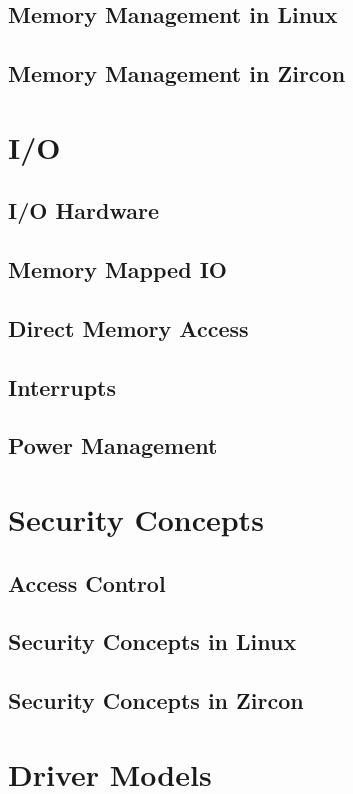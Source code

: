 \subsection{Memory Management in Linux}
\subsection{Memory Management in Zircon}


\section{I/O} %
\subsection{I/O Hardware}
\subsection{Memory Mapped IO}
\subsection{Direct Memory Access}
\subsection{Interrupts}
\subsection{Power Management}

   
\section{Security Concepts} %
\subsection{Access Control} %
\subsection{Security Concepts in Linux}
\subsection{Security Concepts in Zircon}


\section{Driver Models} %
